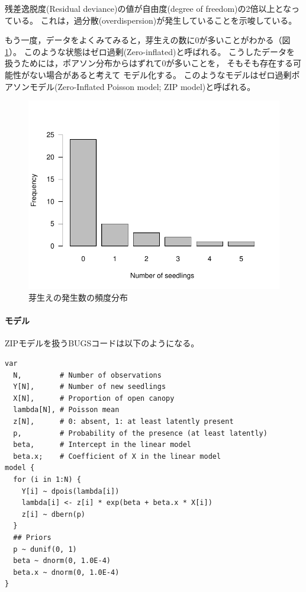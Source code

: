 \documentclass[11pt,uplatex]{jsarticle}
\begin{document}
残差逸脱度(Residual deviance)の値が自由度(degree of freedom)の2倍以上となっている。
これは，過分散(overdispersion)が発生していることを示唆している。

もう一度，データをよくみてみると，芽生えの数に0が多いことがわかる（図\ref{example4_barplot}）。
このような状態はゼロ過剰(Zero-inflated)と呼ばれる。
こうしたデータを扱うためには，ポアソン分布からはずれて0が多いことを，
そもそも存在する可能性がない場合があると考えて
モデル化する。
このようなモデルはゼロ過剰ポアソンモデル(Zero-Inflated Poisson model; ZIP model)と呼ばれる。

\begin{figure}[hbtp]
  \begin{center}
    \includegraphics[bb=0 0 360 270, clip, width=300 bp]{example4_barplot.pdf}
  \end{center}
  \caption{芽生えの発生数の頻度分布}
  \label{example4_barplot}
\end{figure}


\paragraph{モデル}
ZIPモデルを扱うBUGSコードは以下のようになる。

\begin{lstlisting}
var
  N,         # Number of observations
  Y[N],      # Number of new seedlings
  X[N],      # Proportion of open canopy
  lambda[N], # Poisson mean
  z[N],      # 0: absent, 1: at least latently present
  p,         # Probability of the presence (at least latently)
  beta,      # Intercept in the linear model
  beta.x;    # Coefficient of X in the linear model
model {
  for (i in 1:N) {
    Y[i] ~ dpois(lambda[i])
    lambda[i] <- z[i] * exp(beta + beta.x * X[i])
    z[i] ~ dbern(p)
  }
  ## Priors
  p ~ dunif(0, 1)
  beta ~ dnorm(0, 1.0E-4)
  beta.x ~ dnorm(0, 1.0E-4)
}
\end{lstlisting}
\end{document}
